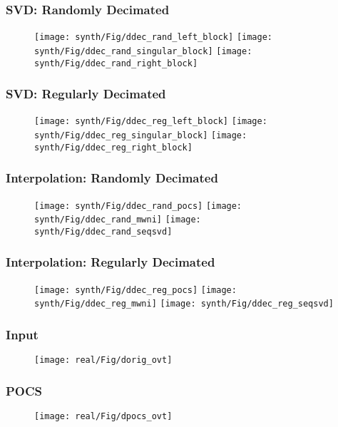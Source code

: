 \begin{frame} \frametitle{SVD: Randomly Decimated}
    \begin{figure}[ht]
    \centering
    \texttt{[image: synth/Fig/ddec\_rand\_left\_block]}\quad
    \texttt{[image: synth/Fig/ddec\_rand\_singular\_block]}\quad
    \texttt{[image: synth/Fig/ddec\_rand\_right\_block]}
    \end{figure}
\end{frame}

\begin{frame} \frametitle{SVD: Regularly Decimated}
    \begin{figure}[ht]
    \centering
    \texttt{[image: synth/Fig/ddec\_reg\_left\_block]}\quad
    \texttt{[image: synth/Fig/ddec\_reg\_singular\_block]}\quad
    \texttt{[image: synth/Fig/ddec\_reg\_right\_block]}
    \end{figure}
\end{frame}

\begin{frame} \frametitle{Interpolation: Randomly Decimated}
    \begin{figure}[ht]
    \centering
    \texttt{[image: synth/Fig/ddec\_rand\_pocs]}\quad
    \texttt{[image: synth/Fig/ddec\_rand\_mwni]}\quad
    \texttt{[image: synth/Fig/ddec\_rand\_seqsvd]}
    \end{figure}
\end{frame}

\begin{frame} \frametitle{Interpolation: Regularly Decimated}
    \begin{figure}[ht]
    \centering
    \texttt{[image: synth/Fig/ddec\_reg\_pocs]}\quad
    \texttt{[image: synth/Fig/ddec\_reg\_mwni]}\quad
    \texttt{[image: synth/Fig/ddec\_reg\_seqsvd]}
    \end{figure}
\end{frame}

\begin{frame} \frametitle{Input}
    \begin{figure}[ht]
    \centering
    \texttt{[image: real/Fig/dorig\_ovt]}
    \end{figure}
\end{frame}

\begin{frame} \frametitle{POCS}
    \begin{figure}[ht]
    \centering
    \texttt{[image: real/Fig/dpocs\_ovt]}
    \end{figure}
\end{frame}

